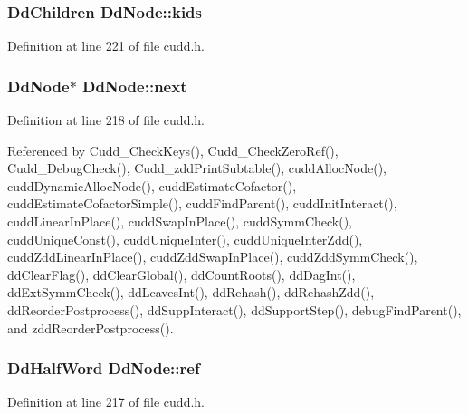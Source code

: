 \subsubsection{\setlength{\rightskip}{0pt plus 5cm}\bf{Dd\-Children} \bf{Dd\-Node::kids}}\label{structDdNode_4e99abf685381a90dcd5e9aa6a024791}




Definition at line 221 of file cudd.h.
\subsubsection{\setlength{\rightskip}{0pt plus 5cm}\bf{Dd\-Node}$\ast$ \bf{Dd\-Node::next}}\label{structDdNode_9422352d3b46de31b325d1cf18b9f25f}




Definition at line 218 of file cudd.h.

Referenced by Cudd\_\-Check\-Keys(), Cudd\_\-Check\-Zero\-Ref(), Cudd\_\-Debug\-Check(), Cudd\_\-zdd\-Print\-Subtable(), cudd\-Alloc\-Node(), cudd\-Dynamic\-Alloc\-Node(), cudd\-Estimate\-Cofactor(), cudd\-Estimate\-Cofactor\-Simple(), cudd\-Find\-Parent(), cudd\-Init\-Interact(), cudd\-Linear\-In\-Place(), cudd\-Swap\-In\-Place(), cudd\-Symm\-Check(), cudd\-Unique\-Const(), cudd\-Unique\-Inter(), cudd\-Unique\-Inter\-Zdd(), cudd\-Zdd\-Linear\-In\-Place(), cudd\-Zdd\-Swap\-In\-Place(), cudd\-Zdd\-Symm\-Check(), dd\-Clear\-Flag(), dd\-Clear\-Global(), dd\-Count\-Roots(), dd\-Dag\-Int(), dd\-Ext\-Symm\-Check(), dd\-Leaves\-Int(), dd\-Rehash(), dd\-Rehash\-Zdd(), dd\-Reorder\-Postprocess(), dd\-Supp\-Interact(), dd\-Support\-Step(), debug\-Find\-Parent(), and zdd\-Reorder\-Postprocess().
\subsubsection{\setlength{\rightskip}{0pt plus 5cm}\bf{Dd\-Half\-Word} \bf{Dd\-Node::ref}}\label{structDdNode_530470565dbead9303a714e120c35b70}




Definition at line 217 of file cudd.h.

